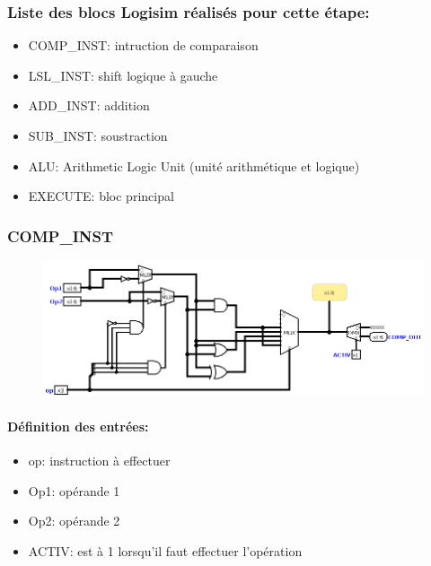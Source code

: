 \documentclass[a4paper]{article} %
\begin{document}
\subsubsection{Liste des blocs Logisim réalisés pour cette étape:}
\begin{itemize}
    \item COMP\_INST: intruction de comparaison
    \item LSL\_INST: shift logique à gauche
    \item ADD\_INST: addition
    \item SUB\_INST: soustraction
    \item ALU: Arithmetic Logic Unit (unité arithmétique et logique)
    \item EXECUTE: bloc principal

\end{itemize}
\subsubsection{COMP\_INST} \label{comp_inst}
\begin{figure}[H]
    \centering
    \includegraphics[width=1\textwidth]{src/COMP_INST.png}
    \label{fig:comp_inst_pic}
\end{figure}
\paragraph{Définition des entrées:}
\begin{itemize}
    \item     op: instruction à effectuer
    \item     Op1: opérande 1
    \item     Op2: opérande 2
    \item     ACTIV: est à 1 lorsqu'il faut effectuer l'opération
\end{itemize}
\end{document}
